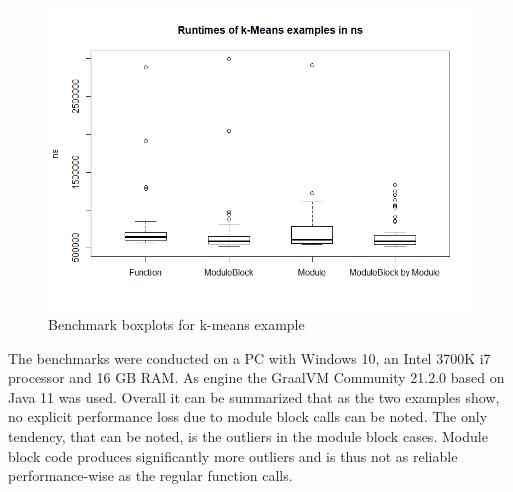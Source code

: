 \begin{figure}[h!]
    \centering
    \includegraphics[scale=0.7]{figures/runtimesKMeansBoxplot.png}
    \caption{Benchmark boxplots for k-means example}
    \label{fig:bKMeans}
\end{figure}
\pagebreak
The benchmarks were conducted on a PC with Windows 10, an Intel 3700K i7 processor and 16 GB RAM. As engine the GraalVM Community 21.2.0 based on Java 11 was used. Overall it can be summarized that as the two examples show, no explicit performance loss due to module block calls can be noted. The only tendency, that can be noted, is the outliers in the module block cases. Module block code produces significantly more outliers and is thus not as reliable performance-wise as the regular function calls. 
